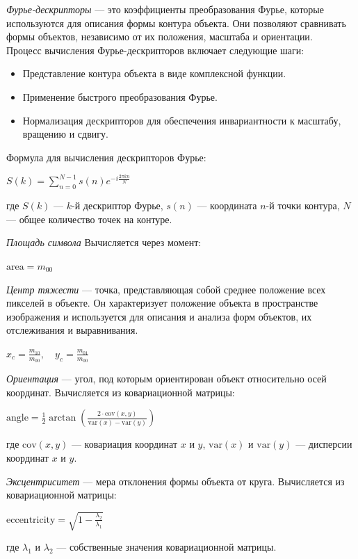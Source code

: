 		\textit{Фурье-дескрипторы} — это коэффициенты преобразования Фурье, которые используются 
		для описания формы контура объекта. Они позволяют сравнивать формы объектов, 
		независимо от их положения, масштаба и ориентации\cite{MShtepa}. \\

		Процесс вычисления Фурье-дескрипторов включает следующие шаги:
		\begin{itemize}
			\item Представление контура объекта в виде комплексной функции.
			\item Применение быстрого преобразования Фурье.
			\item Нормализация дескрипторов для обеспечения инвариантности к масштабу, вращению и сдвигу.
		\end{itemize}
		Формула для вычисления дескрипторов Фурье:
		\begin{center}
			$S(k) = \sum_{n=0}^{N-1} s(n) e^{-i \frac{2 \pi k n}{N}}$
		\end{center}
		где \( S(k) \) — \( k \)-й дескриптор Фурье, \( s(n) \) — координата \( n \)-й точки контура, \( N \) — общее количество точек на контуре.


\textit{Площадь символа}
		Вычисляется через момент:
		\begin{center}
			$\text{area} = m_{00}$
		\end{center}


\textit{Центр тяжести} — точка, представляющая собой 
		среднее положение всех пикселей в объекте. Он характеризует положение 
		объекта в пространстве изображения и используется для описания и анализа 
		форм объектов, их отслеживания и выравнивания\cite{MGladkikh}.
		\begin{center}
			$x_c = \frac{m_{10}}{m_{00}}, \quad y_c = \frac{m_{01}}{m_{00}}$
		\end{center}


\textit{Ориентация} — угол, под которым ориентирован объект относительно осей
		координат. Вычисляется из ковариационной матрицы:
		\begin{center}
			$\text{angle} = \frac{1}{2} \arctan\left(\frac{2 \cdot \text{cov}(x, y)}{\text{var}(x) - \text{var}(y)}\right)$
		\end{center}
		где \( \text{cov}(x, y) \) — ковариация координат \( x \) и \( y \), \( \text{var}(x) \) и \( \text{var}(y) \) — дисперсии координат \( x \) и \( y \).


		\textit{Эксцентриситет} — мера отклонения формы объекта от круга. 
		Вычисляется из ковариационной матрицы:
		\begin{center}
			$\text{eccentricity} = \sqrt{1 - \frac{\lambda_2}{\lambda_1}}$
		\end{center}
		где \( \lambda_1 \) и \( \lambda_2 \) — собственные значения ковариационной матрицы.


